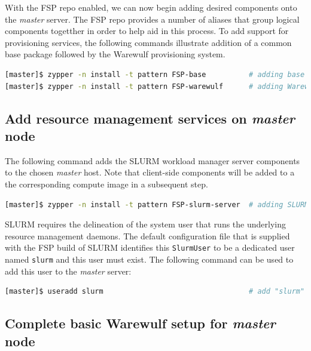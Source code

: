 \documentclass[letterpaper]{article}
\begin{document}
With the FSP repo enabled, we can now begin adding desired components onto the
{\em master} server. The FSP repo provides a number of aliases that group
logical components togetther in order to help aid in this process. To add
support for provisioning services, the following commands illustrate addition
of a common base package followed by the Warewulf provisioning system. 

\begin{lstlisting}[language=bash,keywords={}]
[master]$ zypper -n install -t pattern FSP-base          # adding base FSP packages
[master]$ zypper -n install -t pattern FSP-warewulf      # adding Warewulf support
\end{lstlisting}

\subsection{Add resource management services on {\em master} node}

The following command adds the SLURM workload manager server components to the
chosen {\em master} host. Note that client-side components will be added to a
the corresponding compute image in a subsequent step.

\begin{lstlisting}[language=bash,keywords={}]
[master]$ zypper -n install -t pattern FSP-slurm-server  # adding SLURM server support
\end{lstlisting}

SLURM requires the delineation of the system user that runs the underlying
resource management daemons. The default configuration file that is supplied
with the FSP build of SLURM identifies this \texttt{SlurmUser} to be a
dedicated user named \texttt{slurm} and this user must exist. 
The following command can be used to add this user to the {\em
  master} server:

\begin{lstlisting}[language=bash,keywords={}]
[master]$ useradd slurm                                  # add "slurm" user
\end{lstlisting}


\subsection{Complete basic Warewulf setup for {\em master} node}
\end{document}

